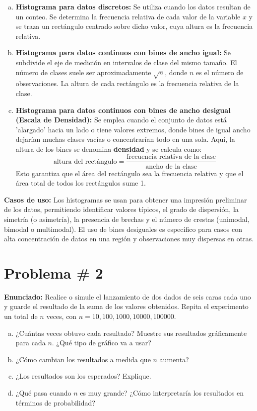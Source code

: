 \documentclass[a4paper]{article}
\begin{document}
\begin{enumerate}[a.]
    \item \textbf{Histograma para datos discretos:} Se utiliza cuando los datos resultan de un conteo. Se determina la frecuencia relativa de cada valor de la variable $x$ y se traza un rectángulo centrado sobre dicho valor, cuya altura es la frecuencia relativa.
    \item \textbf{Histograma para datos continuos con bines de ancho igual:} Se subdivide el eje de medición en intervalos de clase del mismo tamaño. El número de clases suele ser aproximadamente $\sqrt{n}$, donde $n$ es el número de observaciones. La altura de cada rectángulo es la frecuencia relativa de la clase.
    \item \textbf{Histograma para datos continuos con bines de ancho desigual (Escala de Densidad):} Se emplea cuando el conjunto de datos está 'alargado' hacia un lado o tiene valores extremos, donde bines de igual ancho dejarían muchas clases vacías o concentrarían todo en una sola. Aquí, la altura de los bines se denomina \textbf{densidad} y se calcula como:
    $$ \text{altura del rectángulo} = \frac{\text{frecuencia relativa de la clase}}{\text{ancho de la clase}} $$
    Esto garantiza que el área del rectángulo sea la frecuencia relativa y que el área total de todos los rectángulos sume 1.
\end{enumerate}

\textbf{Casos de uso:}
Los histogramas se usan para obtener una impresión preliminar de los datos, permitiendo identificar valores típicos, el grado de dispersión, la simetría (o asimetría), la presencia de brechas y el número de crestas (unimodal, bimodal o multimodal). El uso de bines desiguales es específico para casos con alta concentración de datos en una región y observaciones muy dispersas en otras.

\newpage

\section{Problema \# 2}
\textbf{Enunciado:}
Realice o simule el lanzamiento de dos dados de seis caras cada uno y guarde el resultado de la suma de los valores obtenidos. Repita el experimento un total de $n$ veces, con $n = 10, 100, 1000, 10000, 100000$.

\begin{enumerate}[a.]
    \item ¿Cuántas veces obtuvo cada resultado? Muestre sus resultados gráficamente para cada $n$. ¿Qué tipo de gráfico va a usar?
    \item ¿Cómo cambian los resultados a medida que $n$ aumenta?
    \item ¿Los resultados son los esperados? Explique.
    \item ¿Qué pasa cuando $n$ es muy grande? ¿Cómo interpretaría los resultados en términos de probabilidad?
\end{enumerate}
\end{document}
